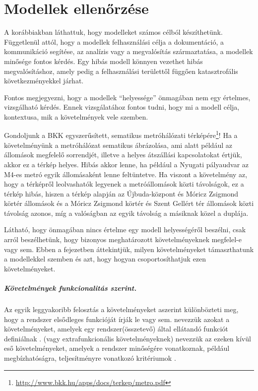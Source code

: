 \chapter{Modellek ellenőrzése}

A korábbiakban láthattuk, hogy modelleket számos célból készíthetünk. Függetlenül attól, hogy a modellek felhasználási célja a dokumentáció, a kommunikáció segítése, az analízis vagy a megvalósítás származtatása, a modellek minősége fontos kérdés. Egy hibás modell könnyen vezethet hibás megvalósításhoz, amely pedig a felhasználási területtől függően katasztrofális következményekkel járhat.

Fontos megjegyezni, hogy a modellek ``helyessége'' önmagában nem egy értelmes, vizsgálható kérdés. Ennek vizsgálatához fontos tudni, hogy mi a modell célja, kontextusa, mik a követelmények vele szemben.

\begin{megjegyzes}
	Gondoljunk a BKK egyszerűsített, sematikus metróhálózati térképére\footnote{\url{http://www.bkk.hu/apps/docs/terkep/metro.pdf}}! Ha a követelményünk a metróhálózat sematikus ábrázolása, ami alatt például az állomások megfelelő sorrendjét, illetve a helyes átszállási kapcsolatokat értjük, akkor ez a térkép helyes. Hibás akkor lenne, ha például a Nyugati pályaudvar az M4-es metró egyik állomásaként lenne feltüntetve. Ha viszont a követelmény az, hogy a térképről leolvashatók legyenek a metróállomások közti távolságok, ez a térkép hibás, hiszen a térkép alapján az Újbuda-központ és Móricz Zsigmond körtér állomások és a Móricz Zsigmond körtér és Szent Gellért tér állomások közti távolság azonos, míg a valóságban az egyik távolság a másiknak közel a duplája. 
\end{megjegyzes}


Látható, hogy önmagában nincs értelme egy modell helyességéről beszélni, csak arról beszélhetünk, hogy bizonyos meghatározott követelményeknek megfelel-e vagy sem.
Ebben a fejezetben áttekintjük, milyen követelményeket támaszthatunk a modellekkel szemben és azt, hogy hogyan csoportosíthatjuk ezen követelményeket.

\paragraph{Követelmények funkcionalitás szerint.}
Az egyik leggyakoribb felosztás a követelményeket aszerint különbözteti meg, hogy a rendszer elsődleges funkcióját írják le vagy sem.  nevezzük azokat a követelményeket, amelyek egy rendszer(összetevő) által ellátandó funkciót definiálnak \cite{IEEE-24765}.
 (vagy extrafunkcionális követelményeknek) nevezzük az ezeken kívül eső követelményeket, amelyek a rendszer minőségére vonatkoznak, például megbízhatóságra, teljesítményre vonatkozó kritériumok \cite{IEEE-24765}.


